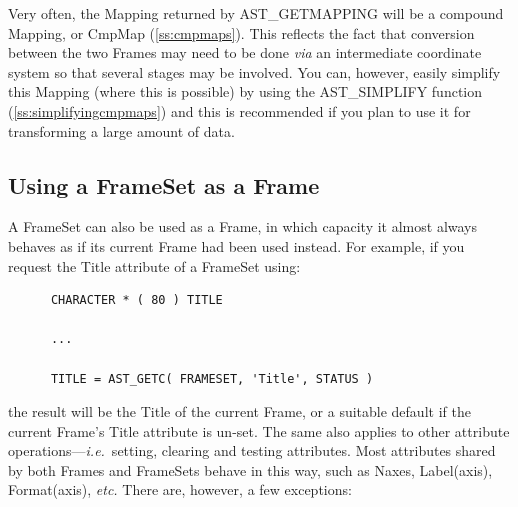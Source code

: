 \documentclass[twoside,11pt]{article}
\newcommand{\htmlref}[2]{#1}
\newcommand{\secref}[1]{\S\ref{#1}}
\renewcommand{\secref}[1]{\ref{#1}}
\begin{document}
Very often, the Mapping returned by AST\_GETMAPPING will be a compound
Mapping, or \htmlref{CmpMap}{CmpMap} (\secref{ss:cmpmaps}). This reflects the fact that
conversion between the two Frames may need to be done {\em{via}} an
intermediate coordinate system so that several stages may be involved.
You can, however, easily simplify this Mapping (where this is possible)
by using the \htmlref{AST\_SIMPLIFY}{AST_SIMPLIFY} function (\secref{ss:simplifyingcmpmaps})
and this is recommended if you plan to use it for transforming a large
amount of data.

\subsection{\label{ss:framesetasframe}Using a FrameSet as a Frame}

A \htmlref{FrameSet}{FrameSet} can also be used as a \htmlref{Frame}{Frame}, in which capacity it almost
always behaves as if its current Frame had been used instead. For
example, if you request the \htmlref{Title}{Title} attribute of a FrameSet using:

\small
\begin{verbatim}
      CHARACTER * ( 80 ) TITLE

      ...

      TITLE = AST_GETC( FRAMESET, 'Title', STATUS )
\end{verbatim}
\normalsize

the result will be the Title of the current Frame, or a suitable
default if the current Frame's Title attribute is un-set. The same
also applies to other attribute operations---{\em{i.e.}}\ setting,
clearing and testing attributes.  Most attributes shared by both
Frames and FrameSets behave in this way, such as \htmlref{Naxes}{Naxes}, \htmlref{Label(axis)}{Labelaxis},
\htmlref{Format(axis)}{Formataxis}, {\em{etc.}} There are, however, a few exceptions:
\end{document}
